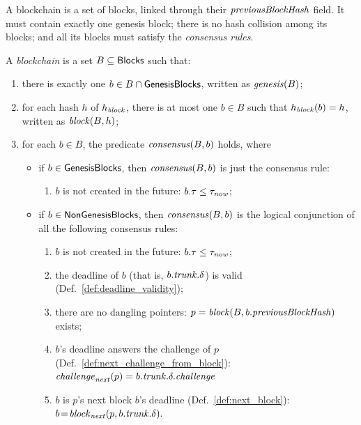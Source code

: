A blockchain is a set of blocks, linked through their ${\mathit{previousBlockHash}}$ field.
It must contain exactly one genesis block; there is no hash collision among its blocks;
and all its blocks must satisfy the \emph{consensus rules}.
%
\begin{definition}\label{def:blockchain}
  A \emph{blockchain} is a set $B\subseteq{\mathsf{Blocks}}$ such that:
  \begin{enumerate}
  \item\label{prop:blockchain:genesis} there is exactly one $b\in B\cap{\mathsf{GenesisBlocks}}$, written as ${\mathit{genesis}}(B)$;
  \item\label{prop:blockchain:no_collision} for each hash $h$ of $h_{\mathit{block}}$, there is at most
    one $b\in B$ such that $h_{\mathit{block}}(b)=h$, written as ${\mathit{block}}(B,h)$;
  \item\label{prop:blockchain:consensus} for each $b\in B$, the predicate ${\mathit{consensus}}(B,b)$ holds, where
    \begin{itemize}
    \item if $b\in{\mathsf{GenesisBlocks}}$, then ${\mathit{consensus}}(B,b)$ is just the consensus rule:
      \begin{enumerate}[label=(\alph*)]
      \item $b$ is not created in the future:
        $%
        b.\tau\le\tau_\now
        $;%
      \end{enumerate}
    \item if $b\in{\mathsf{NonGenesisBlocks}}$, then ${\mathit{consensus}}(B,b)$ is the logical conjunction
      of all the following consensus rules:
      \begin{enumerate}[label=(\alph*)]
      \item\label{prop:consensus:no_future} $b$ is not created in the future:
        $%
        b.\tau\le\tau_\now
        $;%
      \item\label{prop:consensus:valid} the deadline of $b$ (that is, $b.{\mathit{trunk}}.\delta$) is valid (Def.~\ref{def:deadline_validity});
      \item\label{prop:consensus:no_dangling} there are no dangling pointers:
        $%
        p=\block(B,b.\previousblockhash)%
        $ exists;%
      \item\label{prop:consensus:answer} $b$'s deadline answers the challenge of $p$ (Def.~\ref{def:next_challenge_from_block}):
        $%
        \nextchallenge(p)=b.\trunk.\delta.\challenge
        $%
      \item\label{prop:consensus:next_block} $b$ is $p$'s next block \wrt $b$'s deadline (Def.~\ref{def:next_block}):
        $%
        b\!=\!\nextblock(p,b.\trunk.\delta).
        $%
      \end{enumerate}
    \end{itemize}
  \end{enumerate}
\end{definition}
